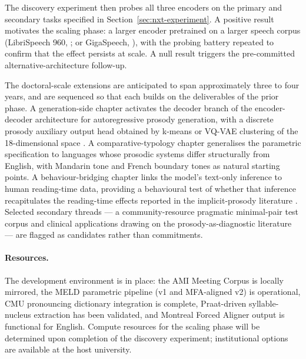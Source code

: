 \documentclass[11pt,letterpaper]{article}
\begin{document}
The discovery experiment then probes all three encoders on the primary and secondary tasks specified in Section~\ref{sec:nxt-experiment}. A positive result motivates the scaling phase: a larger encoder pretrained on a larger speech corpus (LibriSpeech 960, \citealt{panayotov2015librispeech}; or GigaSpeech, \citealt{chen2021gigaspeech}), with the probing battery repeated to confirm that the effect persists at scale. A null result triggers the pre-committed alternative-architecture follow-up.

The doctoral-scale extensions are anticipated to span approximately three to four years, and are sequenced so that each builds on the deliverables of the prior phase. A generation-side chapter activates the decoder branch of the encoder-decoder architecture for autoregressive prosody generation, with a discrete prosody auxiliary output head obtained by k-means or VQ-VAE clustering of the 18-dimensional space \citep{vandenoord2017vqvae}. A comparative-typology chapter generalises the parametric specification to languages whose prosodic systems differ structurally from English, with Mandarin tone and French boundary tones as natural starting points. A behaviour-bridging chapter links the model's text-only inference to human reading-time data, providing a behavioural test of whether that inference recapitulates the reading-time effects reported in the implicit-prosody literature \citep{breen2014review, glushko2022}. Selected secondary threads --- a community-resource pragmatic minimal-pair test corpus and clinical applications drawing on the prosody-as-diagnostic literature \citep{lucarini2020} --- are flagged as candidates rather than commitments.

\paragraph{Resources.} The development environment is in place: the AMI Meeting Corpus is locally mirrored, the MELD parametric pipeline (v1 and MFA-aligned v2) is operational, CMU pronouncing dictionary integration is complete, Praat-driven syllable-nucleus extraction has been validated, and Montreal Forced Aligner output is functional for English. Compute resources for the scaling phase will be determined upon completion of the discovery experiment; institutional options are available at the host university.
\end{document}
